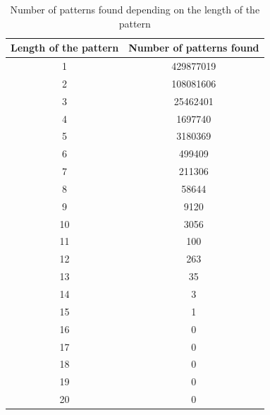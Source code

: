 \documentclass[a4paper, 10pt]{article}
\begin{document}
\begin{table}
	\centering
	\begin{tabular}{c c}
		Length of the pattern & Number of patterns found \\ \hline
		1 & 429877019 \\
		2 & 108081606 \\
		3 & 25462401 \\
		4 & 1697740 \\
		5 & 3180369 \\
		6 & 499409 \\
		7 & 211306 \\
		8 & 58644 \\
		9 & 9120 \\
		10 & 3056 \\
		11 & 100 \\
		12 & 263 \\
		13 & 35 \\
		14 & 3 \\
		15 & 1 \\
		16 & 0 \\
		17 & 0 \\
		18 & 0 \\
		19 & 0 \\
		20 & 0 \\
	\end{tabular}
	\caption{Number of patterns found depending on the length of the pattern}
	\label{tab}
\end{table}



\end{document}
